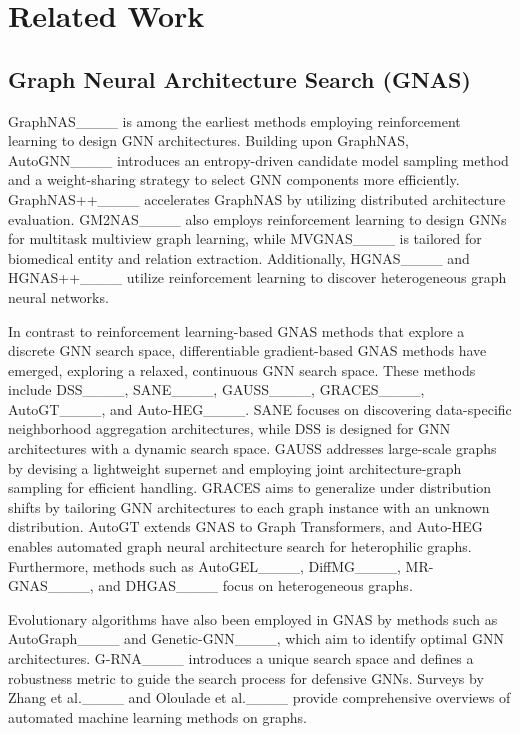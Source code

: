 \section{Related Work}
\subsection{Graph Neural Architecture Search (GNAS)} 

GraphNAS____ is among the earliest methods employing reinforcement learning to design GNN architectures. Building upon GraphNAS, AutoGNN____ introduces an entropy-driven candidate model sampling method and a weight-sharing strategy to select GNN components more efficiently. GraphNAS++____ accelerates GraphNAS by utilizing distributed architecture evaluation. GM2NAS____ also employs reinforcement learning to design GNNs for multitask multiview graph learning, while MVGNAS____ is tailored for biomedical entity and relation extraction. Additionally, HGNAS____ and HGNAS++____ utilize reinforcement learning to discover heterogeneous graph neural networks.

In contrast to reinforcement learning-based GNAS methods that explore a discrete GNN search space, differentiable gradient-based GNAS methods have emerged, exploring a relaxed, continuous GNN search space. These methods include DSS____, SANE____, GAUSS____, GRACES____, AutoGT____, and Auto-HEG____. SANE focuses on discovering data-specific neighborhood aggregation architectures, while DSS is designed for GNN architectures with a dynamic search space. GAUSS addresses large-scale graphs by devising a lightweight supernet and employing joint architecture-graph sampling for efficient handling. GRACES aims to generalize under distribution shifts by tailoring GNN architectures to each graph instance with an unknown distribution. AutoGT extends GNAS to Graph Transformers, and Auto-HEG enables automated graph neural architecture search for heterophilic graphs. Furthermore, methods such as AutoGEL____, DiffMG____, MR-GNAS____, and DHGAS____ focus on heterogeneous graphs.

Evolutionary algorithms have also been employed in GNAS by methods such as AutoGraph____ and Genetic-GNN____, which aim to identify optimal GNN architectures. G-RNA____ introduces a unique search space and defines a robustness metric to guide the search process for defensive GNNs. Surveys by Zhang et al.____ and Oloulade et al.____ provide comprehensive overviews of automated machine learning methods on graphs.

